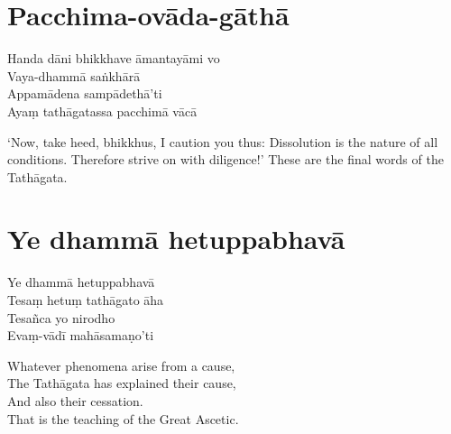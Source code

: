 
\clearpage

\section{Pacchima-ovāda-gāthā}



\begin{paritta}
Handa dāni bhikkhave āmantayāmi vo\\
Vaya-dhammā saṅkhārā\\
Appamādena sampādethā'ti\\
Ayaṃ tathāgatassa pacchimā vācā
\end{paritta}

\begin{english}
  ‘Now, take heed, bhikkhus, I caution you thus: Dissolution is the nature of
  all conditions. Therefore strive on with diligence!’ These are the final words
  of the Tathāgata.
\end{english}


\section{Ye dhammā hetuppabhavā}



\begin{paritta}
  Ye dhammā hetuppabhavā\\
  Tesaṃ hetuṃ tathāgato āha\\
  Tesañca yo nirodho\\
  Evaṃ-vādī mahāsamaṇo'ti
\end{paritta}

\begin{english}
  Whatever phenomena arise from a cause,\\
  The Tathāgata has explained their cause,\\
  And also their cessation.\\
  That is the teaching of the Great Ascetic.
\end{english}


\clearpage

